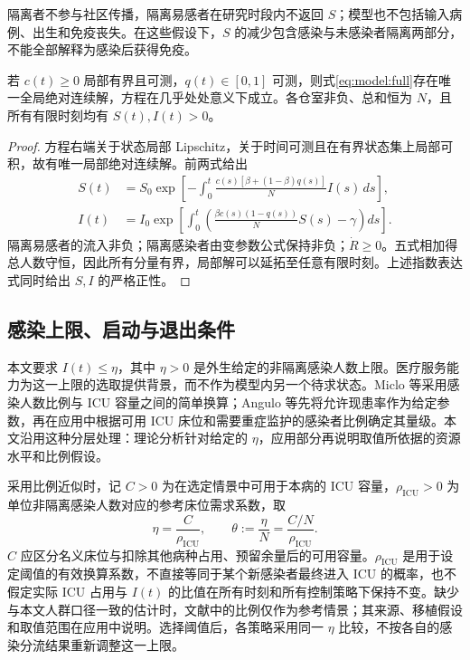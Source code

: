 \documentclass[lang=cn,a4paper,newtx]{elegantpaper}
\numberwithin{equation}{section}
\theoremstyle{plain}
\begin{document}
隔离者不参与社区传播，隔离易感者在研究时段内不返回 $S$；模型也不包括输入病例、出生和免疫丧失。在这些假设下，$S$ 的减少包含感染与未感染者隔离两部分，不能全部解释为感染后获得免疫。

\begin{proposition}
\label{prop:model:positive}
若 $c(t)\ge0$ 局部有界且可测，$q(t)\in[0,1]$ 可测，则式\eqref{eq:model:full}存在唯一全局绝对连续解，方程在几乎处处意义下成立。各仓室非负、总和恒为 $N$，且所有有限时刻均有 $S(t),I(t)>0$。
\end{proposition}
\begin{proof}
方程右端关于状态局部 Lipschitz，关于时间可测且在有界状态集上局部可积，故有唯一局部绝对连续解。前两式给出
\begin{align*}
S(t)&=S_0\exp\!\left[-\int_0^t\frac{c(s)[\beta+(1-\beta)q(s)]}{N}I(s)\,ds\right],\\
I(t)&=I_0\exp\!\left[\int_0^t\left(\frac{\beta c(s)(1-q(s))}{N}S(s)-\gamma\right)ds\right].
\end{align*}
隔离易感者的流入非负；隔离感染者由变参数公式保持非负；$\dot R\ge0$。五式相加得总人数守恒，因此所有分量有界，局部解可以延拓至任意有限时刻。上述指数表达式同时给出 $S,I$ 的严格正性。
\end{proof}

\subsection{感染上限、启动与退出条件}
\label{sec:model:strategy}
本文要求 $I(t)\le\eta$，其中 $\eta>0$ 是外生给定的非隔离感染人数上限。医疗服务能力为这一上限的选取提供背景，而不作为模型内另一个待求状态。Miclo 等\cite{Miclo2022ICU}采用感染人数比例与 ICU 容量之间的简单换算；Angulo 等\cite{Angulo2021}先将允许现患率作为给定参数，再在应用中根据可用 ICU 床位和需要重症监护的感染者比例确定其量级。本文沿用这种分层处理：理论分析针对给定的 $\eta$，应用部分再说明取值所依据的资源水平和比例假设。

采用比例近似时，记 $C>0$ 为在选定情景中可用于本病的 ICU 容量，$\rho_{\mathrm{ICU}}>0$ 为单位非隔离感染人数对应的参考床位需求系数，取
\[
\eta=\frac{C}{\rho_{\mathrm{ICU}}},\qquad
\theta:=\frac{\eta}{N}=\frac{C/N}{\rho_{\mathrm{ICU}}}.
\]
$C$ 应区分名义床位与扣除其他病种占用、预留余量后的可用容量。$\rho_{\mathrm{ICU}}$ 是用于设定阈值的有效换算系数，不直接等同于某个新感染者最终进入 ICU 的概率，也不假定实际 ICU 占用与 $I(t)$ 的比值在所有时刻和所有控制策略下保持不变。缺少与本文人群口径一致的估计时，文献中的比例仅作为参考情景；其来源、移植假设和取值范围在应用中说明。选择阈值后，各策略采用同一 $\eta$ 比较，不按各自的感染分流结果重新调整这一上限。
\end{document}
